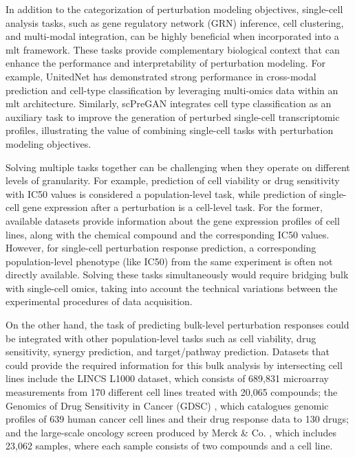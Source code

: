 \documentclass[12pt, a4paper]{article}
\begin{document}
In addition to the categorization of perturbation modeling objectives, single-cell analysis tasks, such as gene regulatory network (GRN) inference, cell clustering, and multi-modal integration, can be highly beneficial when incorporated into a \gls{mlt} framework. These tasks provide complementary biological context that can enhance the performance and interpretability of perturbation modeling.
For example, UnitedNet \cite{tangExplainableMultitaskLearning2023} has demonstrated strong performance in cross-modal prediction and cell-type classification by leveraging multi-omics data within an \gls{mlt} architecture. Similarly, scPreGAN \cite{weiScPreGANDeepGenerative2022} integrates cell type classification as an auxiliary task to improve the generation of perturbed single-cell transcriptomic profiles, illustrating the value of combining single-cell tasks with perturbation modeling objectives.

Solving multiple tasks together can be challenging when they operate on different levels of granularity. For example, prediction of cell viability or drug sensitivity with IC50 values is considered a population-level task, while prediction of single-cell gene expression after a perturbation is a cell-level task. For the former, available datasets provide information about the gene expression profiles of cell lines, along with the chemical compound and the corresponding IC50 values. However, for single-cell perturbation response prediction, a corresponding population-level phenotype (like IC50) from the same experiment is often not directly available. Solving these tasks simultaneously would require bridging bulk with single-cell omics, taking into account the technical variations between the experimental procedures of data acquisition.

On the other hand, the task of predicting bulk-level perturbation responses could be integrated with other population-level tasks such as cell viability, drug sensitivity, synergy prediction, and target/pathway prediction. Datasets that could provide the required information for this bulk analysis by intersecting cell lines include the LINCS L1000 \cite{subramanian2017next} dataset, which consists of 689,831 microarray measurements from 170 different cell lines treated with 20,065 compounds; the Genomics of Drug Sensitivity in Cancer (GDSC) \cite{iorio2016landscape}, which catalogues genomic profiles of 639 human cancer cell lines and their drug response data to 130 drugs; and the large-scale oncology screen produced by Merck \& Co. \cite{o2016unbiased}, which includes 23,062 samples, where each sample consists of two compounds and a cell line.
\end{document}
